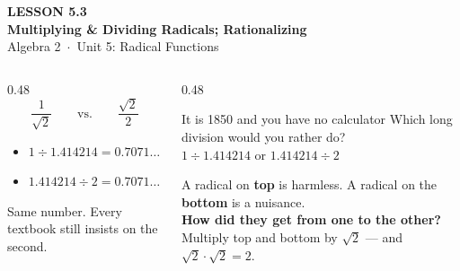 \documentclass[aspectratio=169, 11pt]{beamer}
\begin{document}
{
\begin{frame}[plain]
  \vspace{2.8cm}\hspace{0.55cm}%
  \begin{minipage}{0.9\textwidth}
    {\color{goldacc}\bfseries\small LESSON 5.3}\\[0.5cm]
    {\color{white}\bfseries\LARGE Multiplying \& Dividing Radicals; Rationalizing}\\[1.2cm]
    {\color{forestmid}\small Algebra 2~$\cdot$~Unit 5: Radical Functions}
  \end{minipage}
\end{frame}
}

\begin{frame}[t, plain]
  \begin{columns}[T]
    \begin{column}{0.48\textwidth}
      \[ \frac{1}{\sqrt2} \qquad\text{vs.}\qquad \frac{\sqrt2}{2} \]
      \vspace{-8pt}
      \footnotesize
      \begin{itemize}\setlength{\itemsep}{5pt}
        \item $1 \div 1.414214 = 0.7071\dots$
        \item $1.414214 \div 2 = 0.7071\dots$
      \end{itemize}
      \vspace{5pt}
      {\footnotesize Same number. Every textbook still insists on the second.}
    \end{column}
    \begin{column}{0.48\textwidth}
      \begin{block}{It is 1850 and you have no calculator}
        Which long division would you rather do? \\[4pt]
        $1 \div 1.414214$ \quad or \quad $1.414214 \div 2$
      \end{block}
      \vspace{4pt}
      {\footnotesize A radical on \textbf{top} is harmless. A radical on the \textbf{bottom} is a
      nuisance. \\[4pt]
      \textcolor{goldacc}{\textbf{How did they get from one to the other?}} Multiply top and bottom
      by $\sqrt2$ --- and $\sqrt2\cdot\sqrt2=2$.}
    \end{column}
  \end{columns}
\end{frame}
\end{document}
